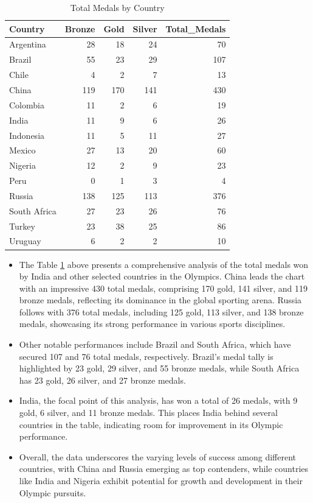 \documentclass[12pt,preprint, authoryear]{elsarticle}
\numberwithin{equation}{section}
\numberwithin{figure}{section}
\numberwithin{table}{section}
\begin{document}
\begingroup\fontsize{11pt}{12pt}\selectfont
\begin{longtable}{lrrrr}
\caption{Total Medals by Country \label{tab:total_medals}} \\ 
  \toprule
Country & Bronze & Gold & Silver & Total\_Medals \\ 
  \midrule
Argentina &  28 &  18 &  24 &  70 \\ 
  Brazil &  55 &  23 &  29 & 107 \\ 
  Chile &   4 &   2 &   7 &  13 \\ 
  China & 119 & 170 & 141 & 430 \\ 
  Colombia &  11 &   2 &   6 &  19 \\ 
  India &  11 &   9 &   6 &  26 \\ 
  Indonesia &  11 &   5 &  11 &  27 \\ 
  Mexico &  27 &  13 &  20 &  60 \\ 
  Nigeria &  12 &   2 &   9 &  23 \\ 
  Peru &   0 &   1 &   3 &   4 \\ 
  Russia & 138 & 125 & 113 & 376 \\ 
  South Africa &  27 &  23 &  26 &  76 \\ 
  Turkey &  23 &  38 &  25 &  86 \\ 
  Uruguay &   6 &   2 &   2 &  10 \\ 
   \bottomrule
\end{longtable}
\endgroup

\begin{itemize}
\item
  The Table \ref{tab:total_medals} above presents a comprehensive
  analysis of the total medals won by India and other selected countries
  in the Olympics. China leads the chart with an impressive 430 total
  medals, comprising 170 gold, 141 silver, and 119 bronze medals,
  reflecting its dominance in the global sporting arena. Russia follows
  with 376 total medals, including 125 gold, 113 silver, and 138 bronze
  medals, showcasing its strong performance in various sports
  disciplines.
\item
  Other notable performances include Brazil and South Africa, which have
  secured 107 and 76 total medals, respectively. Brazil's medal tally is
  highlighted by 23 gold, 29 silver, and 55 bronze medals, while South
  Africa has 23 gold, 26 silver, and 27 bronze medals.
\item
  India, the focal point of this analysis, has won a total of 26 medals,
  with 9 gold, 6 silver, and 11 bronze medals. This places India behind
  several countries in the table, indicating room for improvement in its
  Olympic performance.
\item
  Overall, the data underscores the varying levels of success among
  different countries, with China and Russia emerging as top contenders,
  while countries like India and Nigeria exhibit potential for growth
  and development in their Olympic pursuits.
\end{itemize}
\end{document}
